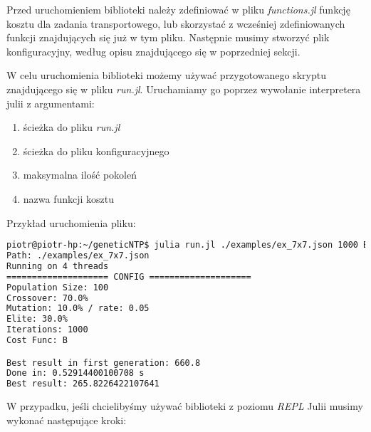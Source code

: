 Przed uruchomieniem biblioteki należy zdefiniować w pliku \textit{functions.jl} funkcję kosztu dla zadania transportowego, lub skorzystać z 
wcześniej zdefiniowanych funkcji znajdujących się już w tym pliku. Następnie musimy stworzyć plik konfiguracyjny, według opisu znajdującego 
się w poprzedniej sekcji.

W celu uruchomienia biblioteki możemy używać przygotowanego skryptu znajdującego się w pliku \textit{run.jl}. Uruchamiamy go poprzez wywołanie 
interpretera julii z argumentami:
\begin{enumerate}
    \item ścieżka do pliku \textit{run.jl}
    \item ścieżka do pliku konfiguracyjnego 
    \item maksymalna ilość pokoleń
    \item nazwa funkcji kosztu
\end{enumerate}

Przykład uruchomienia pliku:

\begin{lstlisting}[language=bash, frame=single]
piotr@piotr-hp:~/geneticNTP$ julia run.jl ./examples/ex_7x7.json 1000 B
Path: ./examples/ex_7x7.json
Running on 4 threads
==================== CONFIG ====================
Population Size: 100
Crossover: 70.0%
Mutation: 10.0% / rate: 0.05
Elite: 30.0%
Iterations: 1000
Cost Func: B

Best result in first generation: 660.8
Done in: 0.52914400100708 s
Best result: 265.8226422107641
\end{lstlisting}

W przypadku, jeśli chcielibyśmy używać biblioteki z poziomu \textit{REPL} Julii musimy wykonać następujące kroki:

